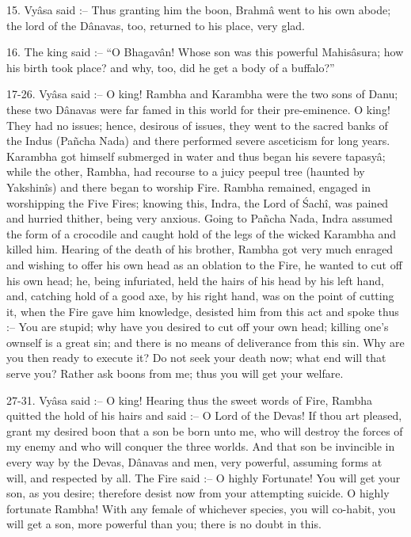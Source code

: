 15. Vy\^asa said :-- Thus granting him the boon, Brahm\^a went to his own abode; the lord of the D\^anavas, too, returned to his place, very glad.

16. The king said :-- ``O Bhagav\^an! Whose son was this powerful Mahis\^asura; how his birth took place? and why, too, did he get a body of a buffalo?''

17-26. Vy\^asa said :-- O king! Rambha and Karambha were the two sons of Danu; these two D\^anavas were far famed in this world for their pre-eminence. O king! They had no issues; hence, desirous of issues, they went to the sacred banks of the Indus (Pañcha Nada) and there performed severe asceticism for long years. Karambha got himself submerged in water and thus began his severe tapasy\^a; while the other, Rambha, had recourse to a juicy peepul tree (haunted by Yakshin\^is) and there began to worship Fire. Rambha remained, engaged in worshipping the Five Fires; knowing this, Indra, the Lord of \'Sach\^i, was pained and hurried thither, being very anxious. Going to Pañcha Nada, Indra assumed the form of a crocodile and caught hold of the legs of the wicked Karambha and killed him. Hearing of the death of his brother, Rambha got very much enraged and wishing to offer his own head as an oblation to the Fire, he wanted to cut off his own head; he, being infuriated, held the hairs of his head by his left hand, and, catching hold of a good axe, by his right hand, was on the point of cutting it, when the Fire gave him knowledge, desisted him from this act and spoke thus :-- You are stupid; why have you desired to cut off your own head; killing one's ownself is a great sin; and there is no means of deliverance from this sin. Why are you then ready to execute it? Do not seek your death now; what end will that serve you? Rather ask boons from me; thus you will get your welfare.

27-31. Vy\^asa said :-- O king! Hearing thus the sweet words of Fire, Rambha quitted the hold of his hairs and said :-- O Lord of the Devas! If thou art pleased, grant my desired boon that a son be born unto me, who will destroy the forces of my enemy and who will conquer the three worlds. And that son be invincible in every way by the Devas, D\^anavas and men, very powerful, assuming forms at will, and respected by all. The Fire said :-- O highly Fortunate! You will get your son, as you desire; therefore desist now from your attempting suicide. O highly fortunate Rambha! With any female of whichever species, you will co-habit, you will get a son, more powerful than you; there is no doubt in this.

